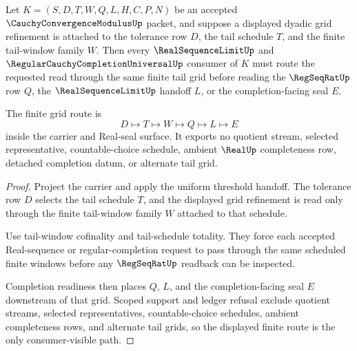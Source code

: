 \begin{theorem}
\label{thm:cauchy-convergence-modulus-uniform-tail-grid}
Let $K=(S,D,T,W,Q,L,H,C,P,N)$ be an accepted $\CauchyConvergenceModulusUp$ packet, and suppose a displayed dyadic grid refinement is attached to the tolerance row $D$, the tail schedule $T$, and the finite tail-window family $W$. Then every $\RealSequenceLimitUp$ and $\RegularCauchyCompletionUniversalUp$ consumer of $K$ must route the requested read through the same finite tail grid before reading the $\RegSeqRatUp$ row $Q$, the $\RealSequenceLimitUp$ handoff $L$, or the completion-facing seal $E$.

The finite grid route is
$$
D\longmapsto T\longmapsto W\longmapsto Q\longmapsto L\longmapsto E
$$
inside the carrier and Real-seal surface. It exports no quotient stream, selected representative, countable-choice schedule, ambient $\RealUp$ completeness row, detached completion datum, or alternate tail grid.
\end{theorem}
\begin{proof}
Project the carrier and apply the uniform threshold handoff. The tolerance row $D$ selects the tail schedule $T$, and the displayed grid refinement is read only through the finite tail-window family $W$ attached to that schedule.

Use tail-window cofinality and tail-schedule totality. They force each accepted Real-sequence or regular-completion request to pass through the same scheduled finite windows before any $\RegSeqRatUp$ readback can be inspected.

Completion readiness then places $Q$, $L$, and the completion-facing seal $E$ downstream of that grid. Scoped support and ledger refusal exclude quotient streams, selected representatives, countable-choice schedules, ambient completeness rows, and alternate tail grids, so the displayed finite route is the only consumer-visible path.
\end{proof}

